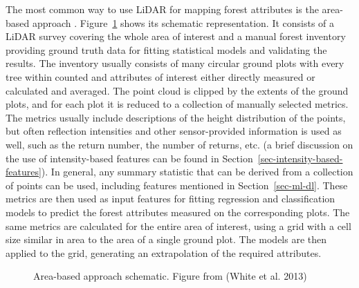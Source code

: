 The most common way to use LiDAR for mapping forest attributes is the area-based approach \citep{whiteABAGuide2013}.
Figure~\ref{fig-aba-schema} shows its schematic representation.
It consists of a LiDAR survey covering the whole area of interest and a manual forest inventory providing ground truth data for fitting statistical models and validating the results.
The inventory usually consists of many circular ground plots with every tree within counted and attributes of interest either directly measured or calculated and averaged.
The point cloud is clipped by the extents of the ground plots, and for each plot it is reduced to a collection of manually selected metrics.
The metrics usually include descriptions of the height distribution of the points, but often reflection intensities and other sensor-provided information is used as well, such as the return number, the number of returns, etc. (a brief discussion on the use of intensity-based features can be found in Section~\ref{sec-intensity-based-features}).
In general, any summary statistic that can be derived from a collection of points can be used, including features mentioned in Section~\ref{sec-ml-dl}.
These metrics are then used as input features for fitting regression and classification models to predict the forest attributes measured on the corresponding plots.
The same metrics are calculated for the entire area of interest, using a grid with a cell size similar in area to the area of a single ground plot.
The models are then applied to the grid, generating an extrapolation of the required attributes.

\begin{figure}
\caption{\label{fig-aba-schema}Area-based approach schematic. Figure
from (White et al. 2013)}
\end{figure}

